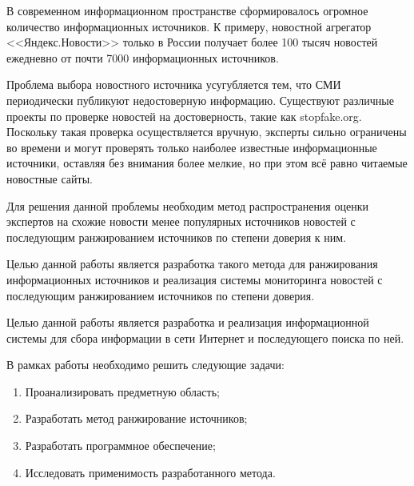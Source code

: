 \Introduction

В современном информационном пространстве сформировалось огромное количество информационных источников. К примеру, новостной агрегатор <<Яндекс.Новости>> только в России получает более 100 тысяч новостей ежедневно от почти 7000 информационных источников.

Проблема выбора новостного источника усугубляется тем, что СМИ периодически публикуют недостоверную информацию. Существуют различные проекты по проверке новостей на достоверность, такие как stopfake.org. Поскольку такая проверка осуществляется вручную, эксперты сильно ограничены во времени и могут проверять только наиболее известные информационные источники, оставляя без внимания более мелкие, но при этом всё равно читаемые новостные сайты.

Для решения данной проблемы необходим метод распространения оценки экспертов на схожие новости менее популярных источников новостей с последующим ранжированием источников по степени доверия к ним.

Целью данной работы является разработка такого метода для ранжирования информационных источников и реализация системы мониторинга новостей с последующим ранжированием источников по степени доверия.

Целью данной работы является разработка и реализация информационной системы для сбора информации в сети Интернет и последующего поиска по ней.

В рамках работы необходимо решить следующие задачи:
\begin{enumerate}
    \item Проанализировать предметную область;
    \item Разработать метод ранжирование источников;
    \item Разработать программное обеспечение;
    \item Исследовать применимость разработанного метода.
\end{enumerate}
